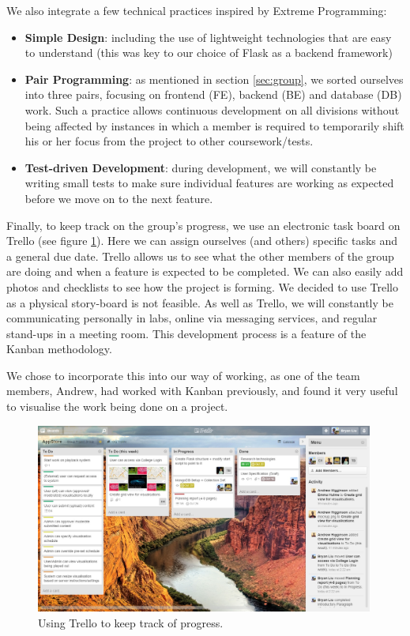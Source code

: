 \documentclass[a4paper]{article}
\begin{document}
We also integrate a few technical practices inspired by Extreme Programming:
\begin{itemize}
  \item \textbf{Simple Design}: including the use of lightweight technologies that are easy to understand (this was key to our choice of Flask as a backend framework)
  \item \textbf{Pair Programming}: as mentioned in section \ref{sec:group}, we sorted
        ourselves into three pairs, focusing on frontend (FE), backend (BE) and database (DB) work.
        Such a practice allows continuous development on all divisions without
        being affected by instances in which a member is required to temporarily shift his or her
        focus from the project to other coursework/tests.
  \item \textbf{Test-driven Development}: during development, we will constantly be writing small tests to make sure individual features are working as expected before we move on to the next feature.

\end{itemize} 

Finally, to keep track on the group's progress, we use an electronic task
board on Trello (see figure \ref{fig:trello}). Here we can assign ourselves (and others) specific tasks and a general due date. Trello allows us to see what the other members of the group are doing and when a feature is expected to be completed. We can also easily add photos and checklists to see how the project is forming. We decided to use Trello as a physical story-board is not feasible. As well as Trello, we will constantly be communicating personally in labs, online via messaging services, and regular stand-ups in a meeting room. This development process is a feature of the Kanban methodology.

We chose to incorporate this into our way of working, as one of the team members, Andrew, had worked with Kanban previously, and found it very useful to visualise the work being done on a project.

\begin{figure}[ht]
  \centering
    \includegraphics[width = 0.99\textwidth]{./planning/trello.jpg}
   
  \caption{Using Trello to keep track of progress.}
  \label{fig:trello}
\end{figure}
\end{document}
